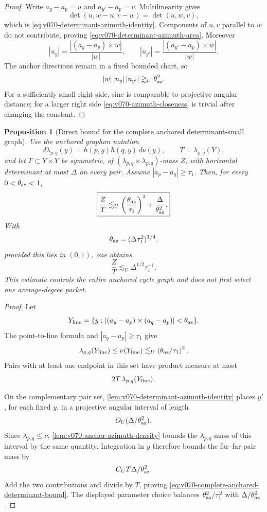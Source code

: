 \documentclass[10pt]{article}
\newtheorem{proposition}[theorem]{Proposition}
\begin{document}
\begin{proof}
Write \(a_y-a_p=u\) and \(a_{y'}-a_p=v\).  Multilinearity gives
\[
\det(u,w-u,v-w)=\det(u,w,v),
\]
which is \eqref{eq:v070-determinant-azimuth-identity}.  Components of \(u,v\) parallel to \(w\)
do not contribute, proving \eqref{eq:v070-determinant-azimuth-area}.  Moreover
\[
|u_y|=\frac{|(a_y-a_p)\times w|}{|w|},
\qquad
|u_{y'}|=\frac{|(a_{y'}-a_p)\times w|}{|w|}.
\]
The anchor directions remain in a fixed bounded chart, so
\[
|w|\,|u_y|\,|u_{y'}|
\gtrsim_U
\theta_{\rm az}^2.
\]
For a sufficiently small right side, sine is comparable to projective angular distance; for a
larger right side \eqref{eq:v070-azimuth-closeness} is trivial after changing the constant.
\end{proof}

\begin{proposition}[Direct bound for the complete anchored determinant-small graph]
\label{prop:v070-complete-anchored-determinant-bound}
Use the anchored graphon notation
\[
d\lambda_{p,q}(y)=h(p,y)h(q,y)\,d\nu(y),
\qquad
T=\lambda_{p,q}(Y),
\]
and let \(\Gamma\subset Y\times Y\) be symmetric, of
\((\lambda_{p,q}\times\lambda_{p,q})\)-mass \(Z\), with horizontal determinant at most
\(\Delta\) on every pair.  Assume \(|a_p-a_q|\ge\tau_1\).  Then, for every
\(0<\theta_{\rm az}<1\),
\begin{equation}
\label{eq:v070-complete-anchored-determinant-bound}
\boxed{
\frac ZT
\lesssim_U
\left(\frac{\theta_{\rm az}}{\tau_1}\right)^2
+\frac{\Delta}{\theta_{\rm az}^2}.
}
\end{equation}
With
\[
\theta_{\rm az}=(\Delta\tau_1^2)^{1/4},
\]
provided this lies in \((0,1)\), one obtains
\begin{equation}
\label{eq:v070-optimized-anchored-determinant-bound}
\boxed{
\frac ZT
\lesssim_U
\Delta^{1/2}\tau_1^{-1}.
}
\end{equation}
This estimate controls the entire anchored cycle graph and does not first select one
average-degree packet.
\end{proposition}

\begin{proof}
Let
\[
Y_{\rm line}
=
\{y:|(a_y-a_p)\times(a_q-a_p)|<\theta_{\rm az}\}.
\]
The point-to-line formula and \(|a_q-a_p|\ge\tau_1\) give
\[
\lambda_{p,q}(Y_{\rm line})
\le\nu(Y_{\rm line})
\lesssim_U
\left(\theta_{\rm az}/\tau_1\right)^2.
\]
Pairs with at least one endpoint in this set have product measure at most
\[
2T\,\lambda_{p,q}(Y_{\rm line}).
\]

On the complementary pair set, \cref{lem:v070-determinant-azimuth-identity} places \(y'\), for
each fixed \(y\), in a projective angular interval of length
\[
O_U(\Delta/\theta_{\rm az}^2).
\]
Since \(\lambda_{p,q}\le\nu\), \cref{lem:v070-anchor-azimuth-density} bounds the
\(\lambda_{p,q}\)-mass of this interval by the same quantity.  Integration in \(y\) therefore
bounds the far--far pair mass by
\[
C_U T\Delta/\theta_{\rm az}^2.
\]
Add the two contributions and divide by \(T\), proving
\eqref{eq:v070-complete-anchored-determinant-bound}.  The displayed parameter choice balances
\(\theta_{\rm az}^2/\tau_1^2\) with
\(\Delta/\theta_{\rm az}^2\).
\end{proof}
\end{document}
